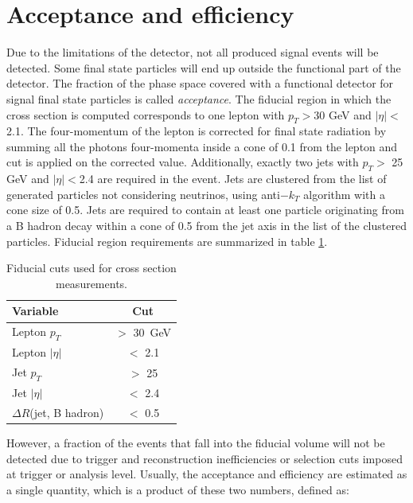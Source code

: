 \section{Acceptance and efficiency}
\label{sec:AE}
    
Due to the limitations of the detector, not all produced signal events will be detected. Some final state particles will end up outside the functional part of the detector. The fraction of the phase space covered with a functional detector for signal final state particles is called \textit{acceptance}. The fiducial region in which the cross section is computed corresponds to one lepton with $p_T>$30 GeV and $|\eta|<$2.1. The four-momentum of the lepton is corrected for final state radiation by summing all the photons four-momenta inside a cone of 0.1 from the lepton and cut is applied on the corrected value. Additionally, exactly two jets with $p_T>$ 25 GeV and $|\eta|<$2.4 are required in the event. Jets are clustered from the list of generated particles not considering neutrinos, using anti$-k_T$ algorithm with a cone size of 0.5. Jets are required to contain at least one particle originating from a B hadron decay within a cone of 0.5 from the jet axis in the list of the clustered particles. Fiducial region requirements are summarized in table \ref{tab:fiducial}.             
\begin{table}[!htb]
\begin{center}
   \begin{tabular} {l c} \hline \hline
        Variable         & Cut \\
        \hline
        Lepton $p_T$    & $>$ 30\ GeV \\
        Lepton $|\eta|$   & $<$ 2.1 \\
        Jet $p_T$       & $>$ 25  \\
        Jet $|\eta|$      & $<$ 2.4 \\
        $\Delta R$(jet, B hadron) & $<$ 0.5 \\
        \hline\hline
   \end{tabular}
\caption{Fiducial cuts used for cross section measurements.}
\label{tab:fiducial}
\end{center}
\end{table}
However, a fraction of the events that fall into the fiducial volume will not be detected due to trigger and reconstruction inefficiencies or selection cuts imposed at trigger or analysis level. Usually, the acceptance and efficiency are estimated as a single quantity, which is a product of these two numbers, defined as:
